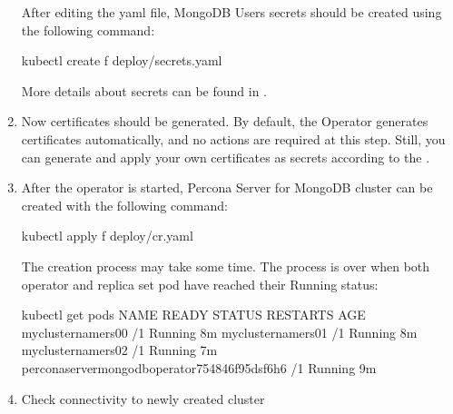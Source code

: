 \documentclass[letterpaper,10pt,english]{sphinxmanual}
\begin{document}
\begin{enumerate}
After editing the yaml file, MongoDB Users secrets should be created
using the following command:

\begin{sphinxVerbatim}[commandchars=\\\{\}]
\PYGZdl{} kubectl create \PYGZhy{}f deploy/secrets.yaml
\end{sphinxVerbatim}

More details about secrets can be found in {\hyperref[\detokenize{users:users}]{}}.

\item {} 
Now certificates should be generated. By default, the Operator generates
certificates automatically, and no actions are required at this step. Still,
you can generate and apply your own certificates as secrets according
to the {\hyperref[\detokenize{TLS:tls}]{}}.

\item {} 
After the operator is started, Percona Server for MongoDB cluster can
be created with the following command:

\begin{sphinxVerbatim}[commandchars=\\\{\}]
\PYGZdl{} kubectl apply \PYGZhy{}f deploy/cr.yaml
\end{sphinxVerbatim}

The creation process may take some time. The process is over when both
operator and replica set pod have reached their Running status:

\begin{sphinxVerbatim}[commandchars=\\\{\}]
\PYGZdl{} kubectl get pods
NAME                                               READY   STATUS    RESTARTS   AGE
my\PYGZhy{}cluster\PYGZhy{}name\PYGZhy{}rs0\PYGZhy{}0                              /1     Running             8m
my\PYGZhy{}cluster\PYGZhy{}name\PYGZhy{}rs0\PYGZhy{}1                              /1     Running             8m
my\PYGZhy{}cluster\PYGZhy{}name\PYGZhy{}rs0\PYGZhy{}2                              /1     Running             7m
percona\PYGZhy{}server\PYGZhy{}mongodb\PYGZhy{}operator\PYGZhy{}754846f95d\PYGZhy{}sf6h6   /1     Running             9m
\end{sphinxVerbatim}

\item {} 
Check connectivity to newly created cluster


\end{enumerate}
\end{document}
